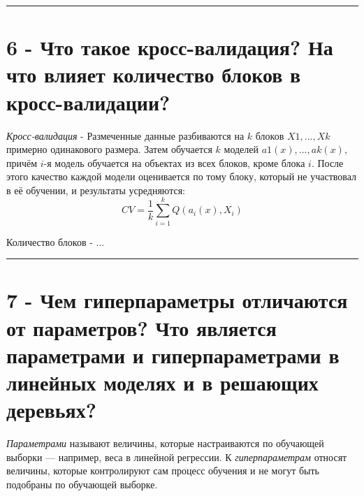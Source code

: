 \documentclass[11pt]{article}
\begin{document}
    \begin{center}\rule{0.5\linewidth}{\linethickness}\end{center}

    \section{6 - Что такое кросс-валидация? На что влияет количество блоков
в
кросс-валидации?}\label{ux447ux442ux43e-ux442ux430ux43aux43eux435-ux43aux440ux43eux441ux441-ux432ux430ux43bux438ux434ux430ux446ux438ux44f-ux43dux430-ux447ux442ux43e-ux432ux43bux438ux44fux435ux442-ux43aux43eux43bux438ux447ux435ux441ux442ux432ux43e-ux431ux43bux43eux43aux43eux432-ux432-ux43aux440ux43eux441ux441-ux432ux430ux43bux438ux434ux430ux446ux438ux438}

\emph{Кросс-валидация} - Размеченные данные разбиваются на \(k\) блоков
\(X1,...,Xk\) примерно одинакового размера. Затем обучается \(k\)
моделей \(a1(x),...,ak(x)\), причём \(i\)-я модель обучается на объектах
из всех блоков, кроме блока \(i\). После этого качество каждой модели
оценивается по тому блоку, который не участвовал в её обучении, и
результаты усредняются: \[CV = \frac{1}{k}\sum_{i=1}^kQ (a_i(x), X_i)\]

Количество блоков - ...

    \begin{center}\rule{0.5\linewidth}{\linethickness}\end{center}

    \section{7 - Чем гиперпараметры отличаются от параметров? Что является
параметрами и гиперпараметрами в линейных моделях и в решающих
деревьях?}\label{ux447ux435ux43c-ux433ux438ux43fux435ux440ux43fux430ux440ux430ux43cux435ux442ux440ux44b-ux43eux442ux43bux438ux447ux430ux44eux442ux441ux44f-ux43eux442-ux43fux430ux440ux430ux43cux435ux442ux440ux43eux432-ux447ux442ux43e-ux44fux432ux43bux44fux435ux442ux441ux44f-ux43fux430ux440ux430ux43cux435ux442ux440ux430ux43cux438-ux438-ux433ux438ux43fux435ux440ux43fux430ux440ux430ux43cux435ux442ux440ux430ux43cux438-ux432-ux43bux438ux43dux435ux439ux43dux44bux445-ux43cux43eux434ux435ux43bux44fux445-ux438-ux432-ux440ux435ux448ux430ux44eux449ux438ux445-ux434ux435ux440ux435ux432ux44cux44fux445}

\emph{Параметрами} называют величины, которые настраиваются по обучающей
выборки --- например, веса в линейной регрессии. К
\emph{гиперпараметрам} относят величины, которые контролируют сам
процесс обучения и не могут быть подобраны по обучающей выборке.
\end{document}
